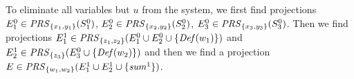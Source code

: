 \begin{example}
To eliminate all variables but $u$ %
from the system, we first find projections $E^0_1\in \mathit{PRS}_{\{x_1, y_1\}}(S^0_1)$, $E^0_2\in \mathit{PRS}_{\{x_2, y_2\}}(S^0_2)$, $E^0_3\in \mathit{PRS}_{\{x_3, y_3\}}(S^0_3)$. Then we find projections $E^1_1\in \prs_{\{z_1,z_2\}}(E^0_1\cup E^0_2\cup %
\{\mi{Def}(w_1)\})$ and $E^1_2\in \prs_{\{z_3\}}(E^0_3\cup %
\{\mi{Def}(w_2)\})$ and then we find a projection $E\in \mathit{PRS}_{\{w_1, w_2\}}(E^1_1\cup E^1_2 \cup \{\mathit{sum}^1\})$.%
\end{example}
